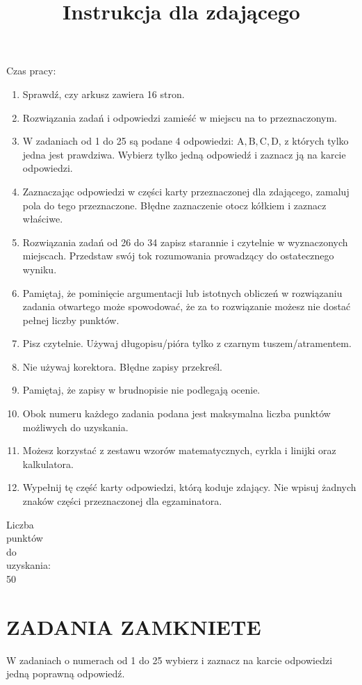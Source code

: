 \documentclass[10pt]{article}
\title{Instrukcja dla zdającego }
\author{}
\date{}
\begin{document}
\maketitle
Czas pracy:

\begin{enumerate}
  \item Sprawdź, czy arkusz zawiera 16 stron.
  \item Rozwiązania zadań i odpowiedzi zamieść w miejscu na to przeznaczonym.
  \item W zadaniach od 1 do 25 są podane 4 odpowiedzi: \(\mathrm{A}, \mathrm{B}, \mathrm{C}, \mathrm{D}\), z których tylko jedna jest prawdziwa. Wybierz tylko jedną odpowiedź i zaznacz ją na karcie odpowiedzi.
  \item Zaznaczając odpowiedzi w części karty przeznaczonej dla zdającego, zamaluj pola do tego przeznaczone. Błędne zaznaczenie otocz kółkiem i zaznacz właściwe.
  \item Rozwiązania zadań od 26 do 34 zapisz starannie i czytelnie w wyznaczonych miejscach. Przedstaw swój tok rozumowania prowadzący do ostatecznego wyniku.
  \item Pamiętaj, że pominięcie argumentacji lub istotnych obliczeń w rozwiązaniu zadania otwartego może spowodować, że za to rozwiązanie możesz nie dostać pełnej liczby punktów.
  \item Pisz czytelnie. Używaj długopisu/pióra tylko z czarnym tuszem/atramentem.
  \item Nie używaj korektora. Błędne zapisy przekreśl.
  \item Pamiętaj, że zapisy w brudnopisie nie podlegają ocenie.
  \item Obok numeru każdego zadania podana jest maksymalna liczba punktów możliwych do uzyskania.
  \item Możesz korzystać z zestawu wzorów matematycznych, cyrkla i linijki oraz kalkulatora.
  \item Wypełnij tę część karty odpowiedzi, którą koduje zdający. Nie wpisuj żadnych znaków części przeznaczonej dla egzaminatora.
\end{enumerate}

Liczba\\
punktów\\
do\\
uzyskania:\\
50

\section*{ZADANIA ZAMKNIETE}
W zadaniach o numerach od 1 do 25 wybierz i zaznacz na karcie odpowiedzi jedną poprawną odpowiedź.
\end{document}
